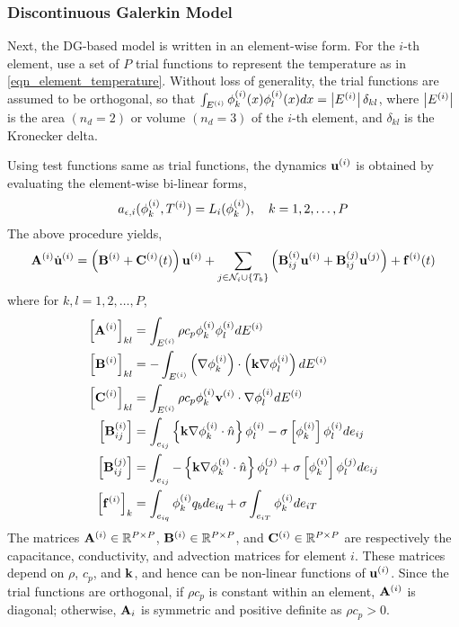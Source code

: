 \subsubsection{Discontinuous Galerkin Model}

Next, the DG-based model is written in an element-wise form. For the $i$-th element, use a set of $P$ trial functions to represent the temperature as in \cref{eqn_element_temperature}. Without loss of generality, the trial functions are assumed to be orthogonal, so that $\int_{E^{(i)}} \phi^{(i)}_k(x) \phi^{(i)}_l(x) dx = \left|E^{(i)}\right|\delta_{kl}$, where $\left|E^{(i)}\right|$ is the area $(n_d=2)$ or volume $(n_d=3)$ of the $i$-th element, and $\delta_{kl}$ is the Kronecker delta.

Using test functions same as trial functions, the dynamics $\mathbf{u}^{(i)}$ is obtained by evaluating the element-wise bi-linear forms,
\begin{equation}
    a_{\epsilon,i}(\phi_k^{(i)},T^{(i)}) = L_i(\phi_k^{(i)}),\quad k=1,2,\dots,P
\end{equation}
The above procedure yields,
\begin{equation}
    \mathbf{A}^{(i)}\dot{\mathbf{u}}^{(i)} = \left(\mathbf{B}^{(i)} + \mathbf{C}^{(i)}(t)\right)\mathbf{u}^{(i)} + \sum_{j\in\mathcal{N}_i\cup\left\{T_b\right\}}\left(\mathbf{B}^{(i)}_{ij}\mathbf{u}^{(i)} + \mathbf{B}^{(j)}_{ij}\mathbf{u}^{(j)}\right) + \mathbf{f}^{(i)}(t)\label{eqn_element_wise_model}
\end{equation}
where for $k,l=1,2,\dots,P$,
\begin{subequations}
    \begin{align}
        \left[\mathbf{A}^{(i)}\right]_{kl} &= \int_{E^{(i)}}\rho c_p\phi_k^{(i)}\phi_l^{(i)}dE^{(i)}\\
        \left[\mathbf{B}^{(i)}\right]_{kl} &= -\int_{E^{(i)}}\left(\nabla\phi_k^{(i)}\right)\cdot\left(\mathbf{k}\nabla\phi_l^{(i)}\right)dE^{(i)}\\
        \left[\mathbf{C}^{(i)}\right]_{kl} &= \int_{E^{(i)}}\rho c_p \phi_k^{(i)}\mathbf{v}^{(i)}\cdot\nabla\phi_l^{(i)}dE^{(i)}\\
        \left[\mathbf{B}^{(i)}_{ij}\right] &= \int_{e_{ij}}\left\{\mathbf{k}\nabla\phi_k^{(i)}\cdot\hat{n}\right\}\phi_l^{(i)} - \sigma\left[\phi_k^{(i)}\right]\phi_l^{(i)}de_{ij}\\
        \left[\mathbf{B}^{(j)}_{ij}\right] &= \int_{e_{ij}}-\left\{\mathbf{k}\nabla\phi_k^{(i)}\cdot\hat{n}\right\}\phi_l^{(j)} + \sigma\left[\phi_k^{(i)}\right]\phi_l^{(j)}de_{ij}\\
        \left[\mathbf{f}^{(i)}\right]_k &= \int_{e_{iq}}\phi_k^{(i)}q_bde_{iq} + \sigma\int_{e_{iT}}\phi_k^{(i)}de_{iT}
    \end{align}
\end{subequations}
The matrices $\mathbf{A}^{(i)}\in\mathbb{R}^{P\times P}$, $\mathbf{B}^{(i)}\in\mathbb{R}^{P\times P}$, and $\mathbf{C}^{(i)}\in\mathbb{R}^{P\times P}$ are respectively the capacitance, conductivity, and advection matrices for element $i$. These matrices depend on $\rho$, $c_p$, and $\mathbf{k}$, and hence can be non-linear functions of $\mathbf{u}^{(i)}$. Since the trial functions are orthogonal, if $\rho c_p$ is constant within an element, $\mathbf{A}^{(i)}$ is diagonal; otherwise, $\mathbf{A}_i$ is symmetric and positive definite as $\rho c_p > 0$.

